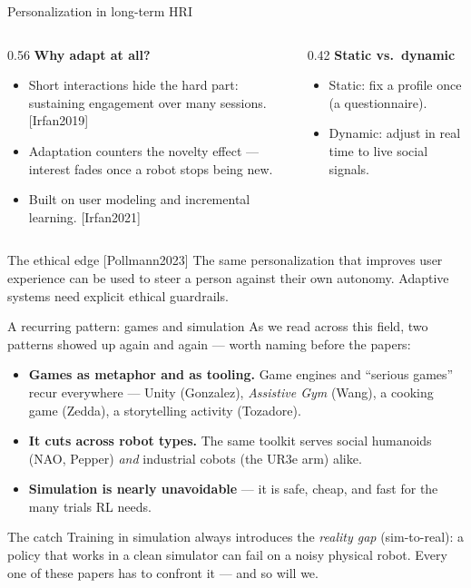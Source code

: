 \documentclass[aspectratio=169,10pt]{beamer}
\newcommand{\refnum}[1]{{\footnotesize\color{giuaccent}[#1]}}
\begin{document}
\begin{frame}{Personalization in long-term HRI}
  \begin{columns}[T]
    \begin{column}{0.56\textwidth}
      \textbf{Why adapt at all?}
      \begin{itemize}\footnotesize
        \item Short interactions hide the hard part: sustaining engagement over many sessions. \refnum{Irfan2019}
        \item Adaptation counters the novelty effect --- interest fades once a robot stops being new.
        \item Built on user modeling and incremental learning. \refnum{Irfan2021}
      \end{itemize}
    \end{column}
    \begin{column}{0.42\textwidth}
      \textbf{Static vs.\ dynamic}
      \begin{itemize}\footnotesize
        \item Static: fix a profile once (a questionnaire).
        \item Dynamic: adjust in real time to live social signals.
      \end{itemize}
    \end{column}
  \end{columns}
  \vspace{0.6em}
  \begin{alertblock}{The ethical edge \refnum{Pollmann2023}}
    The same personalization that improves user experience can be used to steer a person against their own autonomy. Adaptive systems need explicit ethical guardrails.
  \end{alertblock}
\end{frame}

\begin{frame}{A recurring pattern: games and simulation}
  As we read across this field, two patterns showed up again and again --- worth naming before the papers:
  \begin{itemize}
    \item \textbf{Games as metaphor and as tooling.} Game engines and ``serious games'' recur everywhere --- Unity (Gonzalez), \emph{Assistive Gym} (Wang), a cooking game (Zedda), a storytelling activity (Tozadore).
    \item \textbf{It cuts across robot types.} The same toolkit serves social humanoids (NAO, Pepper) \emph{and} industrial cobots (the UR3e arm) alike.
    \item \textbf{Simulation is nearly unavoidable} --- it is safe, cheap, and fast for the many trials RL needs.
  \end{itemize}
  \vspace{0.2em}
  \begin{alertblock}{The catch}
    Training in simulation always introduces the \emph{reality gap} (sim-to-real): a policy that works in a clean simulator can fail on a noisy physical robot. Every one of these papers has to confront it --- and so will we.
  \end{alertblock}
\end{frame}
\end{document}
